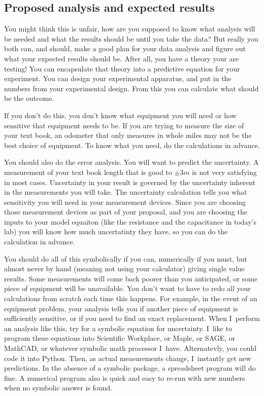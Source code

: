 \subsection{Proposed analysis and expected results}

You might think this is unfair, how are you supposed to know what analysis will be needed and what the results should be until you take the data? But really you both can, and should, make a good plan for your data analysis and figure out what your expected results should be. After all, you have a theory your are testing! You can encapsulate that theory into a predictive equation for your experiment. You can design your experimental apparatus, and put in the numbers from your experimental design. From this you can calculate what should be the outcome.

If you don't do this, you don't know what equipment you will need or how sensitive that equipment needs to be. If you are trying to measure the size of your text book, an odometer that only measures in whole miles may not be the best choice of equipment. To know what you need, do the calculations in advance.

You should also do the error analysis. You will want to predict the uncertainty. A measurement of your text book length that is good to $\pm 3\unit{m}$ is not very satisfying in most cases. Uncertainty in your result is governed by the uncertainty inherent in the measurements you will take. The uncertainty calculation tells you what sensitivity you will need in your measurement devices. Since you are choosing those measurement devices as part of your proposal, and you are choosing the inputs to your model equaiton (like the resistance and the capacitance in today's lab) you will know how much uncertatinty they have, so you can do the calculation in advance.

You should do all of this symbolically if you can, numerically if you must, but almost never by hand (meaning not using your calculator) giving single value results. Some measurements will come back poorer than you anticipated, or some piece of equipment will be unavailable. You don't want to have to redo all your calculations from scratch each time this happens. For example, in the event of an equipment problem, your analysis tells you if another piece of equipment is sufficiently sensitive, or if you need to find an exact replacement. When I\ perform an analysis like this, try for a symbolic equation for uncertainty. I\ like to program these equations into Scientific
Workplace, or Maple, or SAGE, or MathCAD, or whatever symbolic math processor I\ have. Alternatevly, you could code it into Python. Then, as actual measurements change, I\ instantly get new predictions. In the absence of a symbolic package, a spreadsheet program will do fine. A numerical program also is quick and easy to re-run with new numbers when no symbolic answer is found.

